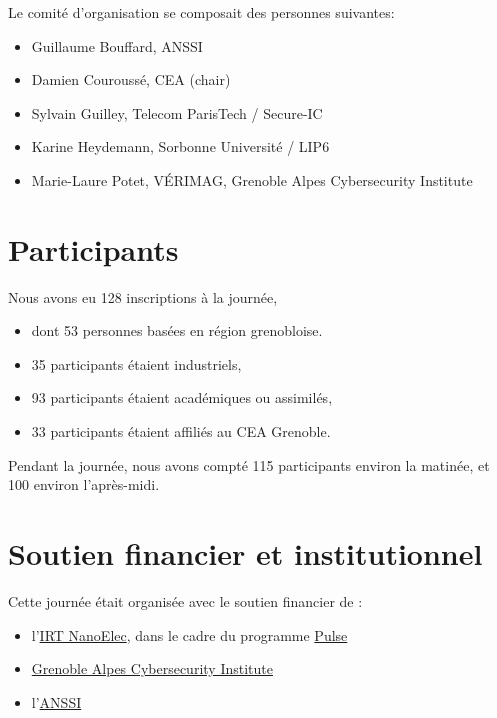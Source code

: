 \documentclass[a4paper,11pt]{article}
\begin{document}
Le comité d'organisation se composait des personnes suivantes:

\begin{itemize}
\item Guillaume Bouffard,  ANSSI
\item Damien Couroussé, CEA  (chair)
\item Sylvain Guilley, Telecom ParisTech / Secure-IC
\item Karine Heydemann, Sorbonne Université / LIP6
\item Marie-Laure Potet, VÉRIMAG,  Grenoble Alpes Cybersecurity Institute
\end{itemize}


\section{Participants}
\label{sec:orgc2716e3}

Nous avons eu 128 inscriptions à la journée,

\begin{itemize}
\item dont 53 personnes basées en région grenobloise.
\item 35 participants étaient industriels,
\item 93 participants étaient académiques ou assimilés,
\item 33 participants étaient affiliés au CEA Grenoble.
\end{itemize}

Pendant la journée, nous avons compté 115 participants environ la
matinée, et 100 environ l'après-midi.

\section{Soutien financier et institutionnel}
\label{sec:orgf20e211}

Cette journée était organisée avec le soutien financier de :

\begin{itemize}
\item l'\href{http://www.irtnanoelec.fr}{IRT NanoElec}, dans le cadre du programme \href{http://www.irtnanoelec.fr/technologies-de-liaison}{Pulse}
\item \href{https://cybersecurity.univ-grenoble-alpes.fr}{Grenoble Alpes Cybersecurity Institute}
\item l'\href{https://www.ssi.gouv.fr}{ANSSI}
\end{itemize}
\end{document}
